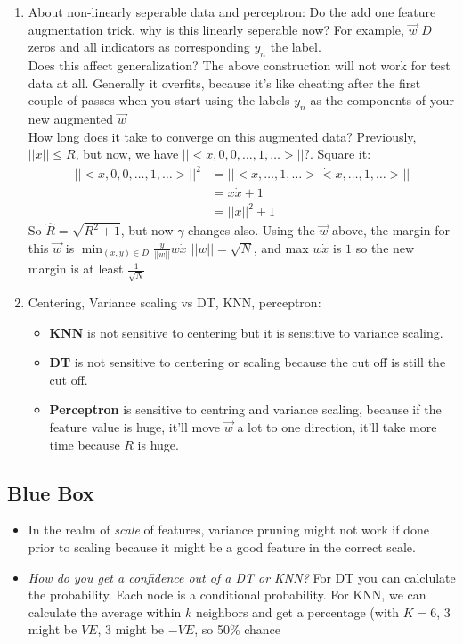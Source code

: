 \begin{enumerate}
\item About non-linearly seperable data and perceptron: Do the add one
  feature augmentation trick, why is this linearly seperable now? For
  example, $\vec w$ $D$ zeros and all indicators as corresponding
  $y_n$ the label.\\
Does this affect generalization? The above construction will not work
for test data at all. Generally it overfits, because it's like
cheating after the first couple of passes when you start using the
labels $y_n$ as the components of your new augmented $\vec w$\\
How long does it take to converge on this augmented data? Previously,
$||x||\le R$, but now, we have $||<x, 0,0,\dots,1,\dots>||?$. Square
it:
\begin{align*}
  ||<x, 0,0,\dots,1,\dots>||^2 &= ||<x,
  \dots,1,\dots>\dot<x,\dots,1,\dots>||\\
&= x\dot x + 1\\
&=||x||^2 + 1
\end{align*}
So $\hat R = \sqrt{R^2+1}$, but now $\gamma$ changes also. Using the
$\vec w$ above, the margin for this $\vec w$ is $\min_{(x,y)\in
  D}\frac{y}{||w||}w\dot x$
$||w|| = \sqrt{N}$, and max $w\dot x$ is $1$ so the new margin is at
least $\frac{1}{\sqrt{N}}$
\item Centering, Variance scaling vs DT, KNN, perceptron:\\
  \begin{itemize}
  \item \textbf{KNN} is not sensitive to centering but it is sensitive to
    variance scaling.
  \item \textbf{DT} is not sensitive to centering or scaling because the cut
    off is still the cut off.
  \item \textbf{Perceptron} is sensitive to centring and variance scaling, because if the
    feature value is huge, it'll move $\vec w$ a lot to one direction,
    it'll take more time because $R$ is huge. 
  \end{itemize}
\end{enumerate}

\subsection{Blue Box}
\label{sec:bluebox}

\begin{itemize}
\item In the realm of \emph{scale} of features, variance pruning might
  not work if done prior to scaling because it might be a good feature
  in the correct scale.
\item \emph{How do you get a confidence out of a DT or KNN?} For DT
  you can calclulate the probability. Each node is a conditional
  probability. For KNN, we can calculate the average within $k$
  neighbors and get a percentage (with $K=6$, 3 might be $VE$, 3 might
  be $-VE$, so 50\% chance
\end{itemize}

